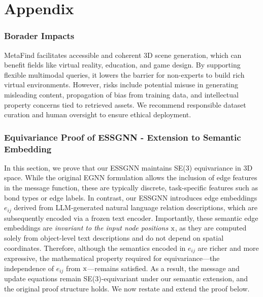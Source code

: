 \appendix
\part*{Appendix}
{
\setlength{\parskip}{-0em}
\startcontents[sections]
}

\label{sec:appendix}

\section{Borader Impacts}
\label{sec::broader}
MetaFind facilitates accessible and coherent 3D scene generation, which can benefit fields like virtual reality, education, and game design. By supporting flexible multimodal queries, it lowers the barrier for non-experts to build rich virtual environments. However, risks include potential misuse in generating misleading content, propagation of bias from training data, and intellectual property concerns tied to retrieved assets. We recommend responsible dataset curation and human oversight to ensure ethical deployment.


\section{Equivariance Proof of ESSGNN - Extension to Semantic Embedding} \label{sec:appendix_equiv_proof}



In this section, we prove that our ESSGNN maintains SE(3) equivariance in 3D space. While the original EGNN \cite{satorras2021n} formulation allows the inclusion of edge features in the message function, these are typically discrete, task-specific features such as bond types or edge labels. In contrast, our ESSGNN introduces edge embeddings \( e_{ij} \) derived from LLM-generated natural language relation descriptions, which are subsequently encoded via a frozen text encoder. Importantly, these semantic edge embeddings are \textit{invariant to the input node positions} \( \rm x \), as they are computed solely from object-level text descriptions and do not depend on spatial coordinates. Therefore, although the semantics encoded in \( e_{ij} \) are richer and more expressive, the mathematical property required for equivariance—the independence of \( e_{ij} \) from \( \rm x \)—remains satisfied. As a result, the message and update equations remain SE(3)-equivariant under our semantic extension, and the original proof structure holds. We now restate and extend the proof below.


